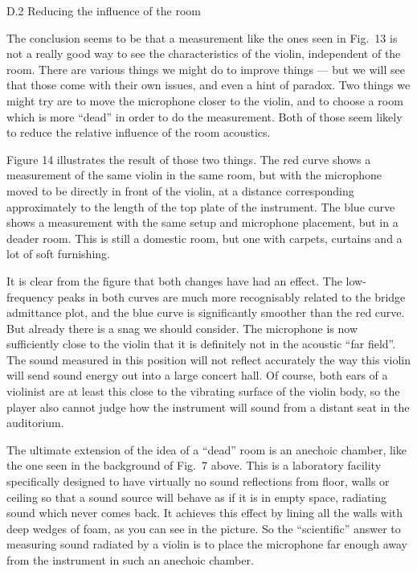   D.2 Reducing the influence of the room 

  The conclusion seems to be that a measurement like the ones seen in Fig.\ 13 
  is not a really good way to see the characteristics of the violin, 
  independent of the room. There are various things we might do to improve 
  things — but we will see that those come with their own issues, and even a 
  hint of paradox. Two things we might try are to move the microphone closer to 
  the violin, and to choose a room which is more “dead” in order to do the 
  measurement. Both of those seem likely to reduce the relative influence of 
  the room acoustics. 

  Figure 14 illustrates the result of those two things. The red curve shows a 
  measurement of the same violin in the same room, but with the microphone 
  moved to be directly in front of the violin, at a distance corresponding 
  approximately to the length of the top plate of the instrument. The blue 
  curve shows a measurement with the same setup and microphone placement, but 
  in a deader room. This is still a domestic room, but one with carpets, 
  curtains and a lot of soft furnishing. 

  It is clear from the figure that both changes have had an effect. The 
  low-frequency peaks in both curves are much more recognisably related to the 
  bridge admittance plot, and the blue curve is significantly smoother than the 
  red curve. But already there is a snag we should consider. The microphone is 
  now sufficiently close to the violin that it is definitely not in the 
  acoustic “far field”. The sound measured in this position will not reflect 
  accurately the way this violin will send sound energy out into a large 
  concert hall. Of course, both ears of a violinist are at least this close to 
  the vibrating surface of the violin body, so the player also cannot judge how 
  the instrument will sound from a distant seat in the auditorium. 

  The ultimate extension of the idea of a “dead” room is an anechoic chamber, 
  like the one seen in the background of Fig.\ 7 above. This is a laboratory 
  facility specifically designed to have virtually no sound reflections from 
  floor, walls or ceiling so that a sound source will behave as if it is in 
  empty space, radiating sound which never comes back. It achieves this effect 
  by lining all the walls with deep wedges of foam, as you can see in the 
  picture. So the “scientific” answer to measuring sound radiated by a violin 
  is to place the microphone far enough away from the instrument in such an 
  anechoic chamber. 

